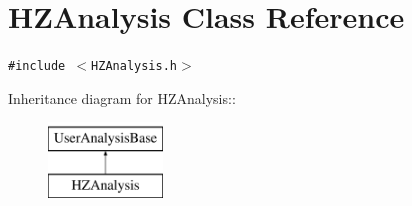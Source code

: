 \hypertarget{classHZAnalysis}{
\section{HZAnalysis Class Reference}
\label{classHZAnalysis}
}
{\tt \#include $<$HZAnalysis.h$>$}

Inheritance diagram for HZAnalysis::\begin{figure}[H]
\begin{center}
\leavevmode
\includegraphics[height=2cm]{classHZAnalysis}
\end{center}
\end{figure}
